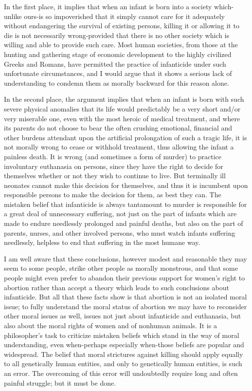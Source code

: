 In the first place, it implies that when an infant is born
into a society which-unlike ours-is so impoverished that it
simply cannot care for it adequately without endangering
the survival of existing persons, killing it or allowing it to
die is not necessarily wrong-provided that there is no
other society which is willing and able to provide such
care. Most human societies, from those at the hunting and
gathering stage of economic development to the highly
civilized Greeks and Romans, have permitted the practice
of infanticide under such unfortunate circumstances, and I
would argue that it shows a serious lack of understanding
to condemn them as morally backward for this reason
alone.

In the second place, the argument implies that when an
infant is born with such severe physical anomalies that its
life would predictably be a very short and/or very
miserable one, even with the most heroic of medical
treatment, and where its parents do not choose to bear the
often crushing emotional, financial and other burdens
attendant upon the artificial prolongation of such a tragic
life, it is not morally wrong to cease or withhold
treatment, thus allowing the infant a painless death. It is
wrong (and sometimes a form of murder) to practice
involuntary euthanasia on persons, since they have the
right to decide for themselves whether or not they wish to
continue to live. But terminally ill neonates cannot make
this decision for themselves, and thus it is incumbent
upon responsible persons to make the decision for them,
as best they can. The mistaken belief that infanticide is
always tantamount to murder is responsible for a great
deal of unnecessary suffering, not just on the part of
infants which are made to endure needlessly prolonged
and painful deaths, but also on the part of parents, nurses,
and other involved persons, who must watch infants
suffering needlessly, helpless to end that suffering in the
most humane way.

I am well aware that these conclusions, however modest
and reasonable they may seem to some people, strike
other people as morally monstrous, and that some people
might even prefer to abandon their previous support for
women’s right to abortion rather than accept a theory
which leads to such conclusions about infanticide. But all
that these facts show is that abortion is not an isolated
moral issue; to fully understand the moral status of
abortion we may have to reconsider other moral issues as
well, issues not just about infanticide and euthanasia, but
also about the moral rights of women and of nonhuman
animals. It is a philosopher’s task to criticize mistaken
beliefs which stand in the way of moral understanding,
even when-perhaps especially when-those beliefs are
popular and widespread. The belief that moral strictures
against killing should apply equally to all genetically
human entities, and only to genetically human entities, is
such an error. The overcoming of this error will
undoubtedly require long and often painful struggle; but it
must be done.
